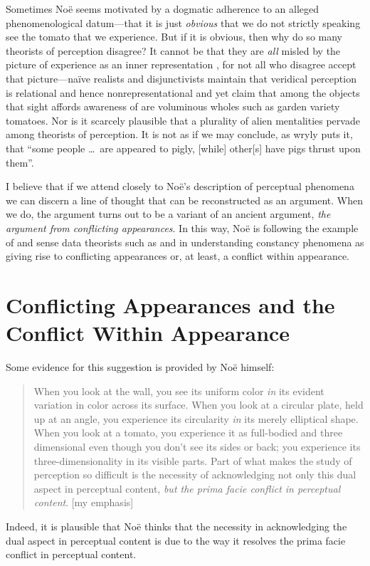 \documentclass[12pt]{article}
\begin{document}
Sometimes Noë seems motivated by a dogmatic adherence to an alleged phenomenological datum---that it is just \emph{obvious} that we do not strictly speaking see the tomato that we experience. But if it is obvious, then why do so many theorists of perception disagree? It cannot be that they are \emph{all} misled by the picture of experience as an inner representation \citep[chapter 2]{Noe:2004fk}, for not all who disagree accept that picture---naïve realists and disjunctivists maintain that veridical perception is relational and hence nonrepresentational and yet claim that among the objects that sight affords awareness of are voluminous wholes such as garden variety tomatoes. Nor is it scarcely plausible that a plurality of alien mentalities pervade among theorists of perception. It is not as if we may conclude, as \citet[69]{Sartwell:1995ve} wryly puts it, that ``some people \ldots\ are appeared to pigly, [while] other[s] have pigs thrust upon them''. 

I believe that if we attend closely to Noë's description of perceptual phenomena we can discern a line of thought that can be reconstructed as an argument. When we do, the argument turns out to be a variant of an ancient argument, \emph{the argument from conflicting appearances}. In this way, Noë is following the example of \citet{Berkeley:1734fk} and sense data theorists such as \citet{Russell:1912uq} and \citet{Price:1932fk} in understanding constancy phenomena as giving rise to conflicting appearances or, at least, a conflict within appearance.


\section{Conflicting Appearances and the Conflict Within Appearance}\label{sec:conflicting_appearances} %

Some evidence for this suggestion is provided by Noë himself:
	\begin{quote}
		When you look at the wall, you see its uniform color \emph{in} its evident variation in color across its surface. When you look at a circular plate, held up at an angle, you experience its circularity \emph{in} its merely elliptical shape. When you look at a tomato, you experience it as full-bodied and three dimensional even though you don't see its sides or back; you experience its three-dimensionality in its visible parts. Part of what makes the study of perception so difficult is the necessity of acknowledging not only this dual aspect in perceptual content, \emph{but the prima facie conflict in perceptual content}. [my emphasis]
	\end{quote}
Indeed, it is plausible that Noë thinks that the necessity in acknowledging the dual aspect in perceptual content is due to the way it resolves the prima facie conflict in perceptual content.
\end{document}

